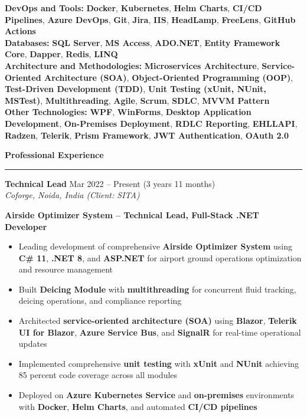 \documentclass[10pt,a4paper]{article}
\newcommand{\sectionheader}[1]{%
    \vspace{8pt}
    {\large\bfseries #1}
    \vspace{2pt}
    \hrule
    \vspace{4pt}
}
\newcommand{\jobentry}[3]{%
    \vspace{4pt}
    {\normalsize\bfseries #1} \hfill #2\\
    \textit{#3}
}
\begin{document}
\textbf{DevOps and Tools:} \textbf{Docker}, \textbf{Kubernetes}, \textbf{Helm Charts}, \textbf{CI/CD Pipelines}, \textbf{Azure DevOps}, \textbf{Git}, \textbf{Jira}, \textbf{IIS}, \textbf{HeadLamp}, \textbf{FreeLens}, \textbf{GitHub Actions}\\[2pt]

\textbf{Databases:} \textbf{SQL Server}, \textbf{MS Access}, \textbf{ADO.NET}, \textbf{Entity Framework Core}, \textbf{Dapper}, \textbf{Redis}, \textbf{LINQ}\\[2pt]

\textbf{Architecture and Methodologies:} \textbf{Microservices Architecture}, \textbf{Service-Oriented Architecture (SOA)}, \textbf{Object-Oriented Programming (OOP)}, \textbf{Test-Driven Development (TDD)}, \textbf{Unit Testing (xUnit, NUnit, MSTest)}, \textbf{Multithreading}, \textbf{Agile}, \textbf{Scrum}, \textbf{SDLC}, \textbf{MVVM Pattern}\\[2pt]

\textbf{Other Technologies:} \textbf{WPF}, \textbf{WinForms}, \textbf{Desktop Application Development}, \textbf{On-Premises Deployment}, \textbf{RDLC Reporting}, \textbf{EHLLAPI}, \textbf{Radzen}, \textbf{Telerik}, \textbf{Prism Framework}, \textbf{JWT Authentication}, \textbf{OAuth 2.0}


\sectionheader{Professional Experience}

\jobentry{Technical Lead}{Mar 2022 -- Present (3 years 11 months)}{Coforge, Noida, India (Client: SITA)}

\textbf{Airside Optimizer System -- Technical Lead, Full-Stack .NET Developer}
\begin{itemize}
    \item Leading development of comprehensive \textbf{Airside Optimizer System} using \textbf{C\# 11}, \textbf{.NET 8}, and \textbf{ASP.NET} for airport ground operations optimization and resource management
    \item Built \textbf{Deicing Module} with \textbf{multithreading} for concurrent fluid tracking, deicing operations, and compliance reporting
    \item Architected \textbf{service-oriented architecture (SOA)} using \textbf{Blazor}, \textbf{Telerik UI for Blazor}, \textbf{Azure Service Bus}, and \textbf{SignalR} for real-time operational updates
    \item Implemented comprehensive \textbf{unit testing} with \textbf{xUnit} and \textbf{NUnit} achieving 85 percent code coverage across all modules
    \item Deployed on \textbf{Azure Kubernetes Service} and \textbf{on-premises} environments with \textbf{Docker}, \textbf{Helm Charts}, and automated \textbf{CI/CD pipelines}
\end{itemize}
\end{document}
